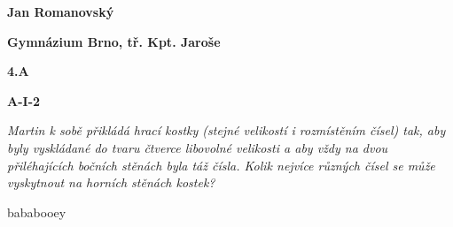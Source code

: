\documentclass{article}
\title{\vspace{-2cm}\vspace{-1.7cm}}
\date{}
\author{}
\begin{document}
\maketitle
\noindent \textbf{Jan Romanovský}

\noindent \textbf{Gymnázium Brno, tř. Kpt. Jaroše}

\noindent \textbf{4.A}

\noindent \textbf{A-\textrm{I}-2}

\textbf{ }

\textit{Martin k sobě přikládá hrací kostky (stejné velikostí i rozmístěním čísel) tak, aby byly vyskládané do tvaru čtverce libovolné velikosti a aby vždy na dvou přiléhajících bočních stěnách byla táž čísla. Kolik nejvíce různých čísel se může vyskytnout na horních stěnách kostek?}

\textbf{ }

bababooey
\end{document}
